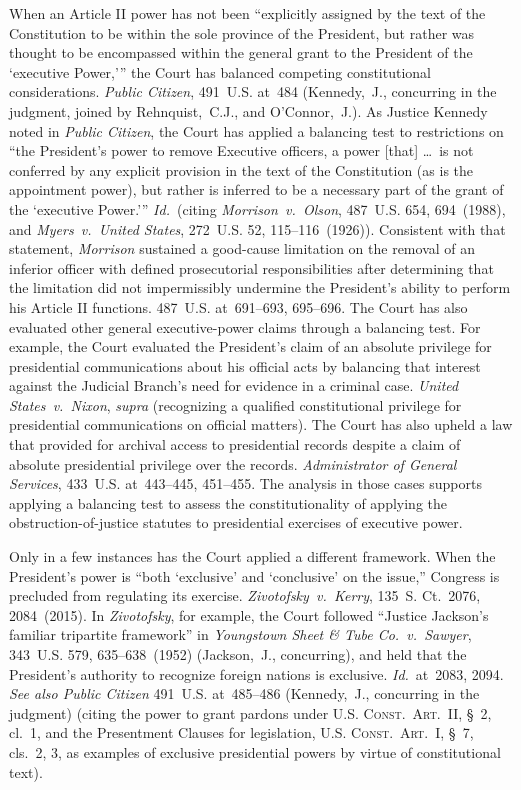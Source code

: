 When an Article II power has not been ``explicitly assigned by the text of the Constitution to be within the sole province of the President, but rather was thought to be encompassed within the general grant to the President of the `executive Power,'\thinspace'' the Court has balanced competing constitutional considerations.
\textit{Public Citizen}, 491~U.S. at~484 (Kennedy,~J., concurring in the judgment, joined by Rehnquist,~C.J., and O'Connor,~J.).
As Justice Kennedy noted in \textit{Public Citizen}, the Court has applied a balancing test to restrictions on ``the President's power to remove Executive officers, a power [that] \dots\ is not conferred by any explicit provision in the text of the Constitution (as is the appointment power), but rather is inferred to be a necessary part of the grant of the `executive Power.'\thinspace''
\textit{Id.}~(citing \textit{Morrison~v.\ Olson}, 487~U.S. 654, 694~(1988), and \textit{Myers~v.\ United States}, 272~U.S. 52, 115--116~(1926)).
Consistent with that statement, \textit{Morrison} sustained a good-cause limitation on the removal of an inferior officer with defined prosecutorial responsibilities after determining that the limitation did not impermissibly undermine the President's ability to perform his Article II functions.
487~U.S. at~691--693, 695--696.
The Court has also evaluated other general executive-power claims through a balancing test.
For example, the Court evaluated the President's claim of an absolute privilege for presidential communications about his official acts by balancing that interest against the Judicial Branch's need for evidence in a criminal case.
\textit{United States~v.\ Nixon}, \textit{supra} (recognizing a qualified constitutional privilege for presidential communications on official matters).
The Court has also upheld a law that provided for archival access to presidential records despite a claim of absolute presidential privilege over the records.
\textit{Administrator of General Services}, 433~U.S. at~443--445, 451--455.
The analysis in those cases supports applying a balancing test to assess the constitutionality of applying the obstruction-of-justice statutes to presidential exercises of executive power.

Only in a few instances has the Court applied a different framework.
When the President's power is ``both `exclusive' and `conclusive' on the issue,'' Congress is precluded from regulating its exercise.
\textit{Zivotofsky~v.\ Kerry}, 135~S. Ct.~2076, 2084~(2015).
In \textit{Zivotofsky}, for example, the Court followed ``Justice Jackson's familiar tripartite framework'' in \textit{Youngstown Sheet \& Tube Co.~v.\ Sawyer}, 343~U.S. 579, 635--638~(1952) (Jackson,~J., concurring), and held that the President's authority to recognize foreign nations is exclusive.
\textit{Id.}~at~2083, 2094.
\textit{See also Public Citizen} 491~U.S. at~485--486 (Kennedy,~J., concurring in the judgment) (citing the power to grant pardons under \textsc{U.S. Const.\ Art.~II}, \S~2, cl.~1, and the Presentment Clauses for legislation, \textsc{U.S. Const.\ Art.~I}, \S~7, cls.~2, 3, as examples of exclusive presidential powers by virtue of constitutional text).

